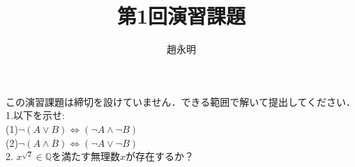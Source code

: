 \documentclass{jarticle}
\begin{document}
\title{第1回演習課題}
\author{趙永明}
\maketitle
\noindent この演習課題は締切を設けていません．できる範囲で解いて提出してください．\\
1.以下を示せ:\\
(1)$\lnot (A\lor B) \Leftrightarrow (\lnot A \land \lnot B)$\\
(2)$\lnot (A\land B) \Leftrightarrow (\lnot A \lor \lnot B)$\\
2.  $x^{\sqrt{2}} \in \mathbb{Q} $を満たす無理数$x$が存在するか？
\end{document}
